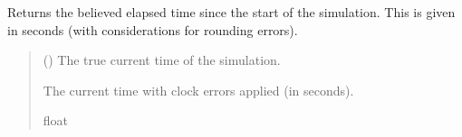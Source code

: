 \documentclass[letterpaper,10pt,english]{sphinxmanual}
\begin{document}
\begin{fulllineitems}
\begin{fulllineitems}
\label{\detokenize{modules/measurement/clock:qnav.measurement.clock.Clock.get_time}}
\pysigstartsignatures
{}
\pysigstopsignatures
\sphinxAtStartPar
Returns the believed elapsed time since the start of the simulation.
This is given in seconds (with considerations for rounding errors).
\begin{quote}\begin{description}
\sphinxAtStartPar
{} () \textendash{} The true current time of the simulation.

\sphinxAtStartPar
The current time with clock errors applied (in seconds).

\sphinxAtStartPar
float

\end{description}\end{quote}

\end{fulllineitems}


\end{fulllineitems}

\end{document}
